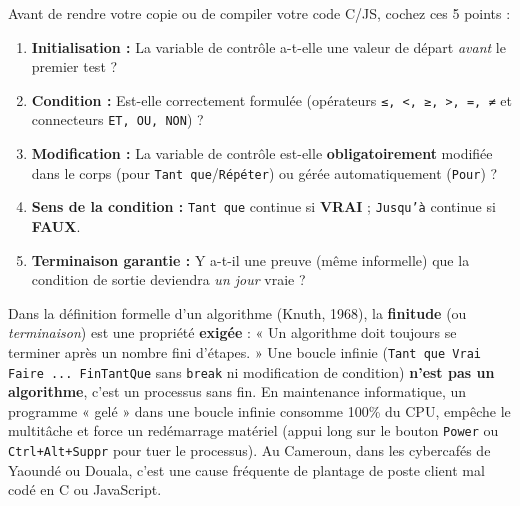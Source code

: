 \documentclass[11pt]{article}
\begin{document}
\begin{aretenir}
Avant de rendre votre copie ou de compiler votre code C/JS, cochez ces 5 points :
\begin{enumerate}
    \item \textbf{Initialisation :} La variable de contrôle a-t-elle une valeur de départ \emph{avant} le premier test ?
    \item \textbf{Condition :} Est-elle correctement formulée (opérateurs \texttt{≤, <, ≥, >, =, ≠} et connecteurs \texttt{ET, OU, NON}) ?
    \item \textbf{Modification :} La variable de contrôle est-elle \textbf{obligatoirement} modifiée dans le corps (pour \texttt{Tant que}/\texttt{Répéter}) ou gérée automatiquement (\texttt{Pour}) ?
    \item \textbf{Sens de la condition :} \texttt{Tant que} continue si \textbf{VRAI} ; \texttt{Jusqu'à} continue si \textbf{FAUX}.
    \item \textbf{Terminaison garantie :} Y a-t-il une preuve (même informelle) que la condition de sortie deviendra \emph{un jour} vraie ?
\end{enumerate}
\end{aretenir}

\begin{savaistu}
Dans la définition formelle d'un algorithme (Knuth, 1968), la \textbf{finitude} (ou \emph{terminaison}) est une propriété \textbf{exigée} : « Un algorithme doit toujours se terminer après un nombre fini d'étapes. »
Une boucle infinie (\texttt{Tant que Vrai Faire ... FinTantQue} sans \texttt{break} ni modification de condition) \textbf{n'est pas un algorithme}, c'est un processus sans fin. En maintenance informatique, un programme « gelé » dans une boucle infinie consomme 100\% du CPU, empêche le multitâche et force un redémarrage matériel (appui long sur le bouton \texttt{Power} ou \texttt{Ctrl+Alt+Suppr} pour tuer le processus). Au Cameroun, dans les cybercafés de Yaoundé ou Douala, c'est une cause fréquente de plantage de poste client mal codé en C ou JavaScript.
\end{savaistu}
\end{document}
